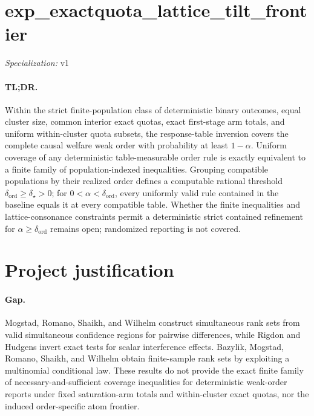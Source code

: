 \documentclass{article}
\begin{document}
\sloppy

\section*{exp\_\allowbreak{}exactquota\_\allowbreak{}lattice\_\allowbreak{}tilt\_\allowbreak{}frontier}

\noindent\textit{Specialization:} v1\par

\paragraph{TL;DR.} Within the strict finite-population class of deterministic binary outcomes, equal cluster size, common interior exact quotas, exact first-stage arm totals, and uniform within-cluster quota subsets, the response-table inversion covers the complete causal welfare weak order with probability at least \(1-\alpha\). Uniform coverage of any deterministic table-measurable order rule is exactly equivalent to a finite family of population-indexed inequalities. Grouping compatible populations by their realized order defines a computable rational threshold \(\delta_{\mathrm{ord}}\ge\delta_\star>0\); for \(0<\alpha<\delta_{\mathrm{ord}}\), every uniformly valid rule contained in the baseline equals it at every compatible table. Whether the finite inequalities and lattice-consonance constraints permit a deterministic strict contained refinement for \(\alpha\ge\delta_{\mathrm{ord}}\) remains open; randomized reporting is not covered.

\section{Project justification}

\paragraph{Gap.} Mogstad, Romano, Shaikh, and Wilhelm construct simultaneous rank sets from valid simultaneous confidence regions for pairwise differences, while Rigdon and Hudgens invert exact tests for scalar interference effects. Bazylik, Mogstad, Romano, Shaikh, and Wilhelm obtain finite-sample rank sets by exploiting a multinomial conditional law. These results do not provide the exact finite family of necessary-and-sufficient coverage inequalities for deterministic weak-order reports under fixed saturation-arm totals and within-cluster exact quotas, nor the induced order-specific atom frontier.
\end{document}
